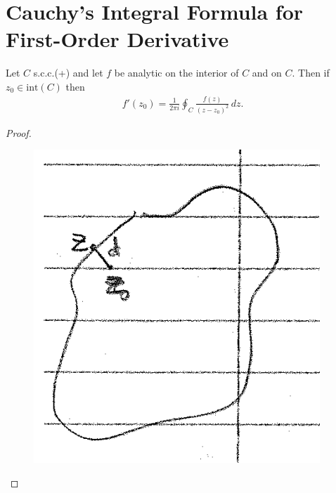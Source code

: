 \documentclass{article}
\theoremstyle{definition}
\newcommand{\f}[2]{\frac{#1}{#2}}
\begin{document}
\section{Cauchy's Integral Formula for First-Order Derivative}
Let $C$ s.c.c.(+) and let $f$ be analytic on the interior of $C$ and on $C$. Then if $z_0 \in \text{int}(C)$ then 
\begin{align}
f'(z_0) = \f{1}{2\pi i}\oint_{C}\f{f(z)}{(z - z_0)^2}\,dz.
\end{align}
\begin{proof}
	\begin{figure}[!htb]
		\centering
		\includegraphics[scale=0.25]{cauchy2}
	\end{figure}
	

\end{proof}
\end{document}
